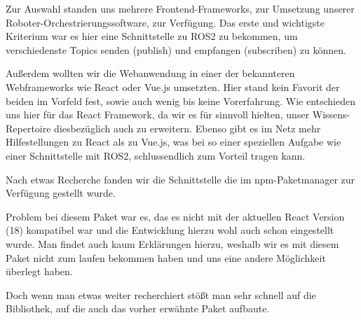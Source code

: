 \begin{flushleft}


    
    Zur Auswahl standen uns mehrere Frontend-Frameworks, zur Umsetzung unserer Roboter-Orchestrierungssoftware, zur Verfügung. Das erste und wichtigste Kriterium war es hier eine Schnittstelle zu ROS2 zu bekommen, um verschiedenste Topics senden (publish) und empfangen (subscriben) zu können. 

    Außerdem wollten wir die Webanwendung in einer der bekannteren Webframeworks wie React oder Vue.js umsetzten. Hier stand kein Favorit der beiden im Vorfeld fest, sowie auch wenig bis keine Vorerfahrung. Wie entschieden uns hier für das React Framework, da wir es für sinnvoll hielten, unser Wissens-Repertoire diesbezüglich auch zu erweitern. Ebenso gibt es im Netz mehr Hilfestellungen zu React als zu Vue.js, was bei so einer speziellen Aufgabe wie einer Schnittstelle mit ROS2, schlussendlich zum Vorteil tragen kann. 

    Nach etwas Recherche fanden wir die \cite[React-ROS]{reactrospackage} Schnittstelle die im npm-Paketmanager zur Verfügung gestellt wurde.

    Problem bei diesem Paket war es, das es nicht mit der aktuellen React Version (18) kompatibel war und die Entwicklung hierzu wohl auch schon eingestellt wurde. Man findet auch kaum Erklärungen hierzu, weshalb wir es mit diesem Paket nicht zum laufen bekommen haben und uns eine andere Möglichkeit überlegt haben.

    Doch wenn man etwas weiter recherchiert stößt man sehr schnell auf die \cite[roslibjs]{roslibjs_robotwebtools} Bibliothek, auf die auch das vorher erwähnte Paket aufbaute. 
    

\end{flushleft}
